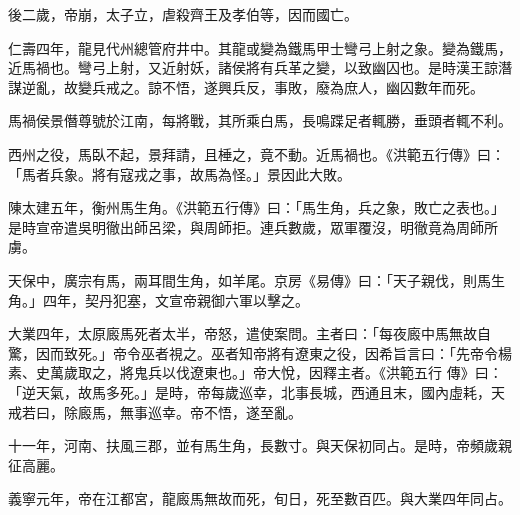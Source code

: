 \begin{pinyinscope}
 後二歲，帝崩，太子立，虐殺齊王及孝伯等，因而國亡。



 仁壽四年，龍見代州總管府井中。其龍或變為鐵馬甲士彎弓上射之象。變為鐵馬，近馬禍也。彎弓上射，又近射妖，諸侯將有兵革之變，以致幽囚也。是時漢王諒潛謀逆亂，故變兵戒之。諒不悟，遂興兵反，事敗，廢為庶人，幽囚數年而死。



 馬禍侯景僭尊號於江南，每將戰，其所乘白馬，長鳴蹀足者輒勝，垂頭者輒不利。



 西州之役，馬臥不起，景拜請，且棰之，竟不動。近馬禍也。《洪範五行傳》曰：「馬者兵象。將有寇戎之事，故馬為怪。」景因此大敗。



 陳太建五年，衡州馬生角。《洪範五行傳》曰：「馬生角，兵之象，敗亡之表也。」是時宣帝遣吳明徹出師呂梁，與周師拒。連兵數歲，眾軍覆沒，明徹竟為周師所虜。



 天保中，廣宗有馬，兩耳間生角，如羊尾。京房《易傳》曰：「天子親伐，則馬生角。」四年，契丹犯塞，文宣帝親御六軍以擊之。



 大業四年，太原廄馬死者太半，帝怒，遣使案問。主者曰：「每夜廄中馬無故自驚，因而致死。」帝令巫者視之。巫者知帝將有遼東之役，因希旨言曰：「先帝令楊素、史萬歲取之，將鬼兵以伐遼東也。」帝大悅，因釋主者。《洪範五行
 傳》曰：「逆天氣，故馬多死。」是時，帝每歲巡幸，北事長城，西通且末，國內虛耗，天戒若曰，除廄馬，無事巡幸。帝不悟，遂至亂。



 十一年，河南、扶風三郡，並有馬生角，長數寸。與天保初同占。是時，帝頻歲親征高麗。



 義寧元年，帝在江都宮，龍廄馬無故而死，旬日，死至數百匹。與大業四年同占。



\end{pinyinscope}